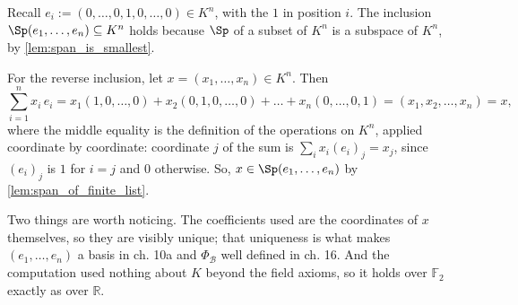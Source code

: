 \begin{exercisesolution}
\label{sol:check_standard_span}
Recall $e_i := (0, \dots, 0, 1, 0, \dots, 0) \in K^n$, with the $1$ in position $i$. The inclusion $\Sp(e_1, \dots, e_n) \subseteq K^n$ holds because $\Sp$ of a subset of $K^n$ is a subspace of $K^n$, by \cref{lem:span_is_smallest}.

For the reverse inclusion, let $x = (x_1, \dots, x_n) \in K^n$. Then
\[
    \sum_{i=1}^{n} x_i \, e_i
    = x_1 (1, 0, \dots, 0) + x_2 (0, 1, 0, \dots, 0) + \dots + x_n (0, \dots, 0, 1)
    = (x_1, x_2, \dots, x_n) = x,
\]
where the middle equality is the definition of the operations on $K^n$, applied coordinate by coordinate: coordinate $j$ of the sum is $\sum_i x_i (e_i)_j = x_j$, since $(e_i)_j$ is $1$ for $i = j$ and $0$ otherwise. So, $x \in \Sp(e_1, \dots, e_n)$ by \cref{lem:span_of_finite_list}.

Two things are worth noticing. The coefficients used are the coordinates of $x$ themselves, so they are visibly unique; that uniqueness is what makes $(e_1, \dots, e_n)$ a basis in ch. 10a and $\Phi_{\mathcal{B}}$ well defined in ch. 16. And the computation used nothing about $K$ beyond the field axioms, so it holds over $\mathbb{F}_2$ exactly as over $\mathbb{R}$.
\end{exercisesolution}

